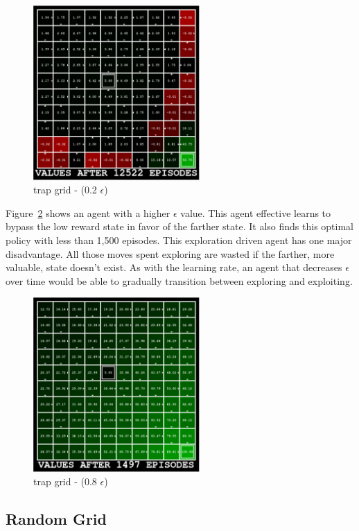\documentclass{sig-alternate}
\begin{document}
\begin{figure}[!htbp]
    \centering
    \includegraphics[width=2.5in]{images/trap/e02.pdf}
    \caption{trap grid - (0.2 $\epsilon$) \label{trap-e02}}
\end{figure} 

Figure~\ref{trap-e08} shows an agent with a higher $\epsilon$ value. This agent effective learns to bypass the low reward state in favor of the farther state. It also finds this optimal policy with less than 1,500 episodes. This exploration driven agent has one major disadvantage. All those moves spent exploring are wasted if the farther, more valuable, state doesn't exist. As with the learning rate, an agent that decreases $\epsilon$ over time would be able to gradually transition between exploring and exploiting.

\begin{figure}[!htbp]
    \centering
    \includegraphics[width=2.5in]{images/trap/e08.pdf}
    \caption{trap grid - (0.8 $\epsilon$) \label{trap-e08}}
\end{figure} 


\subsection{Random Grid}
\end{document}
